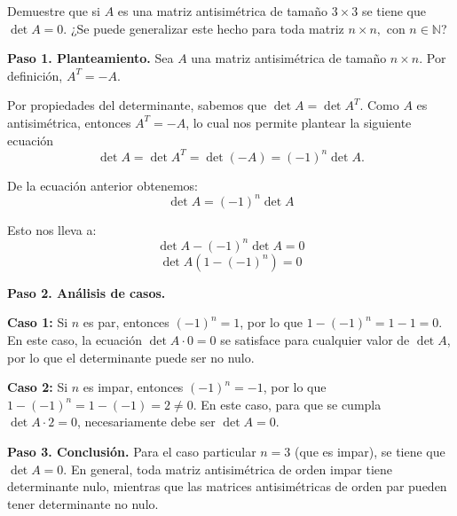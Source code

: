 \begin{prob} 
Demuestre que si $A$ es una matriz antisimétrica de tamaño $3\times 3$ se tiene que $\det A=0.$ ¿Se puede generalizar este hecho para toda matriz $n \times n,$ con $n\in \mathbb{N}$?

\begin{myproof}
\textbf{Paso 1. Planteamiento.} Sea $A$ una matriz antisimétrica de tamaño $n \times n$. Por definición, $A^{T} = -A$.

Por propiedades del determinante, sabemos que $\det A = \det A^{T}$. Como $A$ es antisimétrica, entonces $A^{T} = -A$, lo cual nos permite plantear la siguiente ecuación $$\det A = \det A^{T}= \det (-A)= (-1)^{n}\det A.$$

De la ecuación anterior obtenemos:
$$\det A = (-1)^{n}\det A$$

Esto nos lleva a:
$$\det A - (-1)^{n}\det A = 0$$
$$\det A(1 - (-1)^{n}) = 0$$

\textbf{Paso 2. Análisis de casos.}

\textbf{Caso 1:} Si $n$ es par, entonces $(-1)^{n} = 1$, por lo que $1 - (-1)^{n} = 1 - 1 = 0$. En este caso, la ecuación $\det A \cdot 0 = 0$ se satisface para cualquier valor de $\det A$, por lo que el determinante puede ser no nulo.

\textbf{Caso 2:} Si $n$ es impar, entonces $(-1)^{n} = -1$, por lo que $1 - (-1)^{n} = 1 - (-1) = 2 \neq 0$. En este caso, para que se cumpla $\det A \cdot 2 = 0$, necesariamente debe ser $\det A = 0$.

\textbf{Paso 3. Conclusión.} Para el caso particular $n = 3$ (que es impar), se tiene que $\det A = 0$. En general, toda matriz antisimétrica de orden impar tiene determinante nulo, mientras que las matrices antisimétricas de orden par pueden tener determinante no nulo.

\end{myproof}
\end{prob}

